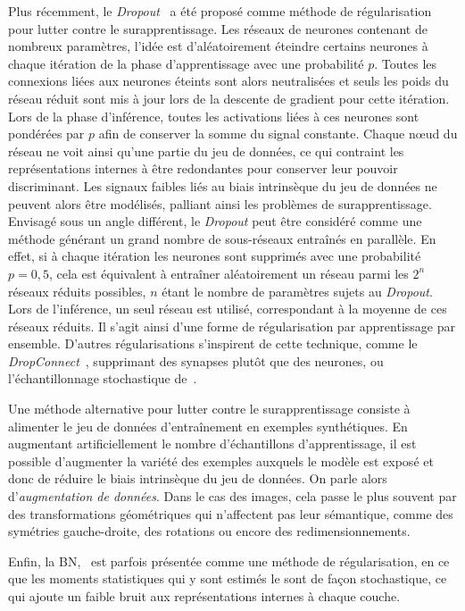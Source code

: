 Plus récemment, le \emph{Dropout}~\cite{srivastava_dropout_2014} a été proposé comme méthode de régularisation pour lutter contre le surapprentissage. Les réseaux de neurones contenant de nombreux paramètres, l'idée est d'aléatoirement éteindre certains neurones à chaque itération de la phase d'apprentissage avec une probabilité $p$. Toutes les connexions liées aux neurones éteints sont alors neutralisées et seuls les poids du réseau réduit sont mis à jour lors de la descente de gradient pour cette itération. Lors de la phase d'inférence, toutes les activations liées à ces neurones sont pondérées par $p$ afin de conserver la somme du signal constante. Chaque n\oe{}ud du réseau ne voit ainsi qu'une partie du jeu de données, ce qui contraint les représentations internes à être redondantes pour conserver leur pouvoir discriminant. Les signaux faibles liés au biais intrinsèque du jeu de données ne peuvent alors être modélisés, palliant ainsi les problèmes de surapprentissage. Envisagé sous un angle différent, le \emph{Dropout} peut être considéré comme une méthode générant un grand nombre de sous-réseaux entraînés en parallèle. En effet, si à chaque itération les neurones sont supprimés avec une probabilité $p = 0,5$, cela est équivalent à entraîner aléatoirement un réseau parmi les $2^n$ réseaux réduits possibles, $n$ étant le nombre de paramètres sujets au \emph{Dropout}. Lors de l'inférence, un seul réseau est utilisé, correspondant à la moyenne de ces réseaux réduits. Il s'agit ainsi d'une forme de régularisation par apprentissage par ensemble. D'autres régularisations s'inspirent de cette technique, comme le \emph{DropConnect}~\cite{wan_regularization_2013}, supprimant des synapses plutôt que des neurones, ou l'échantillonnage stochastique de~\citet{zeiler_stochastic_2013}.

Une méthode alternative pour lutter contre le surapprentissage consiste à alimenter le jeu de données d'entraînement en exemples synthétiques. En augmentant artificiellement le nombre d'échantillons d'apprentissage, il est possible d'augmenter la variété des exemples auxquels le modèle est exposé et donc de réduire le biais intrinsèque du jeu de données. On parle alors d'\emph{augmentation de données}. Dans le cas des images, cela passe le plus souvent par des transformations géométriques qui n'affectent pas leur sémantique, comme des symétries gauche-droite, des rotations ou encore des redimensionnements.

Enfin, la \gls{BN},~\cite{ioffe_batch_2015} est parfois présentée comme une méthode de régularisation, en ce que les moments statistiques qui y sont estimés le sont de façon stochastique, ce qui ajoute un faible bruit aux représentations internes à chaque couche.

